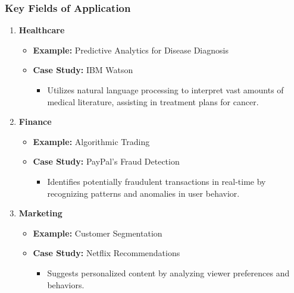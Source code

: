 \documentclass[aspectratio=169]{beamer}
\begin{document}
\begin{frame}[fragile]
    \frametitle{Key Fields of Application}
    \begin{enumerate}
        \item \textbf{Healthcare}
            \begin{itemize}
                \item \textbf{Example:} Predictive Analytics for Disease Diagnosis 
                \item \textbf{Case Study:} IBM Watson 
                \begin{itemize}
                    \item Utilizes natural language processing to interpret vast amounts of medical literature, assisting in treatment plans for cancer.
                \end{itemize}
            \end{itemize}

        \item \textbf{Finance}
            \begin{itemize}
                \item \textbf{Example:} Algorithmic Trading 
                \item \textbf{Case Study:} PayPal's Fraud Detection 
                \begin{itemize}
                    \item Identifies potentially fraudulent transactions in real-time by recognizing patterns and anomalies in user behavior.
                \end{itemize}
            \end{itemize}

        \item \textbf{Marketing}
            \begin{itemize}
                \item \textbf{Example:} Customer Segmentation 
                \item \textbf{Case Study:} Netflix Recommendations 
                \begin{itemize}
                    \item Suggests personalized content by analyzing viewer preferences and behaviors.
                \end{itemize}
            \end{itemize}
    \end{enumerate}
\end{frame}
\end{document}
